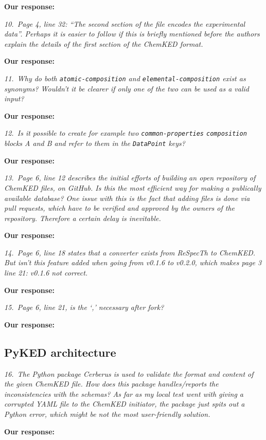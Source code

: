 \documentclass[a4paper,10pt]{elsarticle}
\begin{document}
\textbf{Our response:}

\textit{10.~Page 4, line 32: ``The second section of the file encodes the experimental data''. Perhaps it is easier to follow if this is briefly mentioned before the authors explain the details of the first section of the ChemKED format.}

\textbf{Our response:}

\textit{11.~Why do both \texttt{atomic-composition} and \texttt{elemental-composition} exist as synonyms? Wouldn't it be clearer if only one of the two can be used as a valid input?}

\textbf{Our response:}


\textit{12.~Is it possible to create for example two \texttt{common-properties} \texttt{composition} blocks A and B and refer to them in the \texttt{DataPoint} keys?}

\textbf{Our response:}


\textit{13.~Page 6, line 12 describes the initial efforts of building an open repository of ChemKED files, on GitHub. Is this the most efficient way for making a publically available database? One issue with this is the fact that adding files is done via pull requests, which have to be verified and approved by the owners of the repository. Therefore a certain delay is inevitable.}

\textbf{Our response:}

\textit{14.~Page 6, line 18 states that a converter exists from ReSpecTh to ChemKED. But isn't this feature added when going from v0.1.6 to v0.2.0, which makes page 3 line 21: v0.1.6 not correct.}

\textbf{Our response:}


\textit{15.~Page 6, line 21, is the `,' necessary after fork?}

\textbf{Our response:}


\subsection*{PyKED architecture}

\textit{16.~The Python package Cerberus is used to validate the format and content of the given ChemKED file. How does this package handles/reports the inconsistencies with the schemas? As far as my local test went with giving a corrupted YAML file to the ChemKED initiator, the package just spits out a Python error, which might be not the most user-friendly solution.}

\textbf{Our response:}
\end{document}

